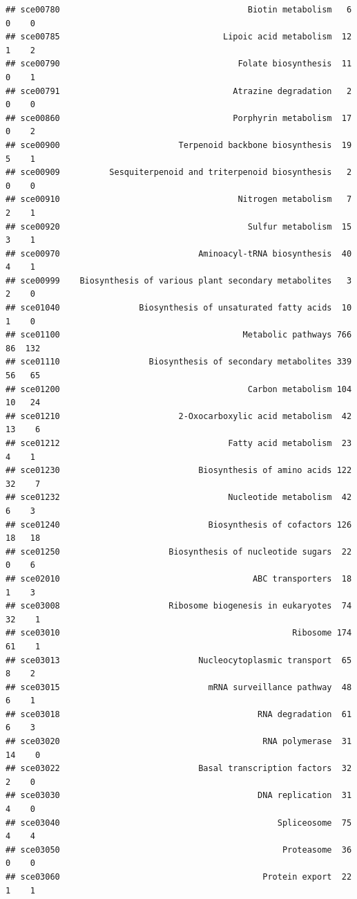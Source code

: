 \documentclass[
]{book}
\begin{document}
\begin{verbatim}
## sce00780                                      Biotin metabolism   6  0    0
## sce00785                                 Lipoic acid metabolism  12  1    2
## sce00790                                    Folate biosynthesis  11  0    1
## sce00791                                   Atrazine degradation   2  0    0
## sce00860                                   Porphyrin metabolism  17  0    2
## sce00900                        Terpenoid backbone biosynthesis  19  5    1
## sce00909          Sesquiterpenoid and triterpenoid biosynthesis   2  0    0
## sce00910                                    Nitrogen metabolism   7  2    1
## sce00920                                      Sulfur metabolism  15  3    1
## sce00970                            Aminoacyl-tRNA biosynthesis  40  4    1
## sce00999    Biosynthesis of various plant secondary metabolites   3  2    0
## sce01040                Biosynthesis of unsaturated fatty acids  10  1    0
## sce01100                                     Metabolic pathways 766 86  132
## sce01110                  Biosynthesis of secondary metabolites 339 56   65
## sce01200                                      Carbon metabolism 104 10   24
## sce01210                        2-Oxocarboxylic acid metabolism  42 13    6
## sce01212                                  Fatty acid metabolism  23  4    1
## sce01230                            Biosynthesis of amino acids 122 32    7
## sce01232                                  Nucleotide metabolism  42  6    3
## sce01240                              Biosynthesis of cofactors 126 18   18
## sce01250                      Biosynthesis of nucleotide sugars  22  0    6
## sce02010                                       ABC transporters  18  1    3
## sce03008                      Ribosome biogenesis in eukaryotes  74 32    1
## sce03010                                               Ribosome 174 61    1
## sce03013                            Nucleocytoplasmic transport  65  8    2
## sce03015                              mRNA surveillance pathway  48  6    1
## sce03018                                        RNA degradation  61  6    3
## sce03020                                         RNA polymerase  31 14    0
## sce03022                            Basal transcription factors  32  2    0
## sce03030                                        DNA replication  31  4    0
## sce03040                                            Spliceosome  75  4    4
## sce03050                                             Proteasome  36  0    0
## sce03060                                         Protein export  22  1    1

\end{verbatim}
\end{document}

